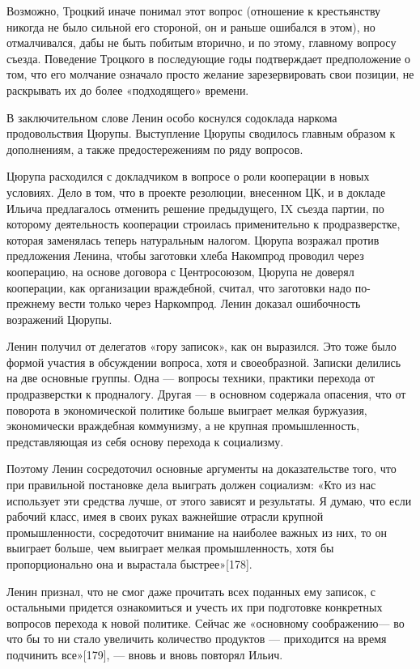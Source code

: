 \documentclass[12pt, a4paper, openany]{book}
\begin{document}
Возможно, Троцкий иначе понимал этот вопрос (отношение к крестьянству никогда не было сильной его стороной, он и раньше ошибался в этом), но отмалчивался, дабы не быть побитым вторично, и по этому, главному вопросу съезда. Поведение Троцкого в последующие годы подтверждает предположение о том, что его молчание означало просто желание зарезервировать свои позиции, не раскрывать их до более «подходящего» времени.

В заключительном слове Ленин особо коснулся содоклада наркома продовольствия Цюрупы. Выступление Цюрупы сводилось главным образом к дополнениям, а также предостережениям по ряду вопросов.

Цюрупа расходился с докладчиком в вопросе о роли кооперации в новых условиях. Дело в том, что в проекте резолюции, внесенном ЦК, и в докладе Ильича предлагалось отменить решение предыдущего, IX съезда партии, по которому деятельность кооперации строилась применительно к продразверстке, которая заменялась теперь натуральным налогом. Цюрупа возражал против предложения Ленина, чтобы заготовки хлеба Накомпрод проводил через кооперацию, на основе договора с Центросоюзом, Цюрупа не доверял кооперации, как организации враждебной, считал, что заготовки надо по-прежнему вести только через Наркомпрод. Ленин доказал ошибочность возражений Цюрупы.

Ленин получил от делегатов «гору записок», как он выразился. Это тоже было формой участия в обсуждении вопроса, хотя и своеобразной. Записки делились на две основные группы. Одна — вопросы техники, практики перехода от продразверстки к продналогу. Другая — в основном содержала опасения, что от поворота в экономической политике больше выиграет мелкая буржуазия, экономически враждебная коммунизму, а не крупная промышленность, представляющая из себя основу перехода к социализму.

Поэтому Ленин сосредоточил основные аргументы на доказательстве того, что при правильной постановке дела выиграть должен социализм: «Кто из нас использует эти средства лучше, от этого зависят и результаты. Я думаю, что если рабочий класс, имея в своих руках важнейшие отрасли крупной промышленности, сосредоточит внимание на наиболее важных из них, то он выиграет больше, чем выиграет мелкая промышленность, хотя бы пропорционально она и вырастала быстрее»[178].

Ленин признал, что не смог даже прочитать всех поданных ему записок, с остальными придется ознакомиться и учесть их при подготовке конкретных вопросов перехода к новой политике. Сейчас же «основному соображению— во что бы то ни стало увеличить количество продуктов — приходится на время подчинить все»[179], — вновь и вновь повторял Ильич.
\end{document}
